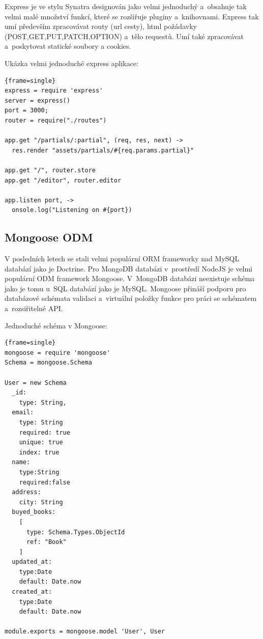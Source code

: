\documentclass[a4paper,12pt,twoside,BCOR=10mm]{article}
\newenvironment{codeframe}{%
  \begin{Sbox} 
    \begin{minipage} 
      {\columnwidth-\leftmargin-\rightmargin-2\fboxsep-2\fboxrule-4pt} 
}{%

  \end{minipage} 
  \end{Sbox} 
  \begin{center} 
    \fcolorbox{black}{codeback}{\TheSbox} 
  \end{center} 
}
\begin{document}
Express je ve stylu Synatra designován jako velmi jednoduchý a~obsahuje tak velmi malé množství funkcí, které se rozšiřuje pluginy a~knihovnami. Express tak umí především zpracovávat routy (url cesty), html požádavky (POST,GET,PUT,PATCH,OPTION) a~tělo requestů. Umí také zpracovávat a~poskytovat statické soubory a cookies.

Ukázka velmi jednoduché express aplikace:
     \begin{codeframe} 
      \begin{Verbatim}{frame=single}
express = require 'express'
server = express()
port = 3000;
router = require("./routes")

app.get "/partials/:partial", (req, res, next) ->
  res.render "assets/partials/#{req.params.partial}"

app.get "/", router.store
app.get "/editor", router.editor

app.listen port, ->
  onsole.log("Listening on #{port})
\end{Verbatim} 
    \end{codeframe}

\subsection{Mongoose ODM}
V posledních letech se stali velmi populární ORM frameworky nad MySQL databází jako je Doctrine. Pro MongoDB databázi v~prostředí NodeJS je velmi populární ODM framework Mongoose. V~MongoDB databázi neexistuje schéma jako je tomu u~SQL databází jako je MySQL. Mongoose přináší podporu pro databázové schémata validaci a~virtuální položky funkce pro práci se schématem a~rozsiřitelné API. 

Jednoduché schéma v Mongoose:
     \begin{codeframe} 
      \begin{Verbatim}{frame=single}
mongoose = require 'mongoose'
Schema = mongoose.Schema

User = new Schema
  _id:
    type: String,
  email:
    type: String
    required: true
    unique: true
    index: true
  name:
    type:String
    required:false
  address:
    city: String
  buyed_books:
    [
      type: Schema.Types.ObjectId
      ref: "Book"
    ]
  updated_at:
    type:Date
    default: Date.now
  created_at:
    type:Date
    default: Date.now

module.exports = mongoose.model 'User', User
\end{Verbatim} 
    \end{codeframe}
\end{document}
